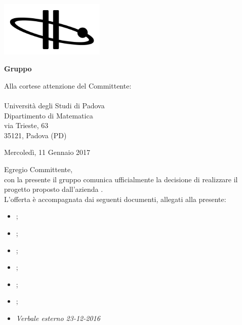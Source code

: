   
	\begin{titlepage}
	
	\begin{center}
	 	
	\includegraphics[width=5cm]{../../modello/or-bit_bkg_minBorder.png} 
	\begin{Huge} 
	 	\textbf{Gruppo \GroupName{}}
	\end{Huge}
	\end{center}
	
	\vspace{0,5cm}
	\begin{large}
	\begin{flushright}
		Alla cortese attenzione del Committente: \\
		\Committente \\
		Università degli Studi di Padova \\
		Dipartimento di Matematica \\
		via Trieste, 63 \\
		35121, Padova (PD) 
		
		\vspace{0,3cm}
		
		Mercoledì, 11 Gennaio 2017
	\end{flushright}

	\vspace{0,5cm}
	
	Egregio Committente, \\
	con la presente il gruppo \GroupName{} comunica ufficialmente la decisione di realizzare il progetto \ProjectName{} proposto dall'azienda \Proponente{}.\\
	
	
	L'offerta è accompagnata dai seguenti documenti, allegati alla presente:
	\begin{itemize}
		\item \AnalisiDeiRequisiti{};
		\item \Glossario{};
		\item \NormeDiProgetto{};
		\item \PianoDiProgetto{};
		\item \PianoDiQualifica{};
		\item \StudioDiFattibilita{};
		\item \emph{Verbale esterno 23-12-2016}
	\end{itemize}
	

\end{large}
\end{titlepage}
